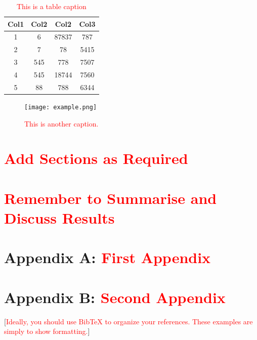 \documentclass[aps,pra,a4paper,nofootinbib,preprint,12pt]{revtex4-1} %
\begin{document}
\begin{table}[b]
\begin{center}
 \begin{tabular}{||c c c c||} 
 \hline
 Col1 & Col2 & Col2 & Col3 \\ [0.5ex] 
 \hline\hline
 1 & 6 & 87837 & 787 \\ 
 \hline
 2 & 7 & 78 & 5415 \\
 \hline
 3 & 545 & 778 & 7507 \\
 \hline
 4 & 545 & 18744 & 7560 \\
 \hline
 5 & 88 & 788 & 6344 \\ [1ex] 
 \hline
\end{tabular}
\end{center}
\caption[\textcolor{red}{Short Table Caption}]{\textcolor{red}{This is a table caption}}
\label{table:example1} %
\end{table}

\begin{figure}[b]
\texttt{[image: example.png]}
\caption[\textcolor{red}{Another Short Caption}]{\textcolor{red}{This is another caption.}}
\label{fig:example2}
\end{figure}

\newpage
\section{\textcolor{red}{Add Sections as Required}}

\newpage
\section{\textcolor{red}{Remember to Summarise and Discuss Results}}

\appendix

\newpage
\section{Appendix A: \textcolor{red}{First Appendix}}


\newpage
\section{Appendix B: \textcolor{red}{Second Appendix}}


\newpage

[\textcolor{red}{Ideally, you should use BibTeX to organize your references. These examples are simply to show formatting.}]
\end{document}
